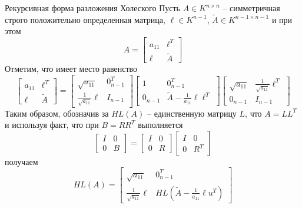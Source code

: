 \documentclass[10pt]{beamer}
\begin{document}
\begin{frame}{Рекурсивная форма разложения Холеского}
Пусть $A\in K^{n\times n}$ -- симметричная строго положительно определенная матрица, $\ell\in K^{n-1
}$, $\tilde{A}\in K^{n-1\times n-1}$ и при этом
$$
A=\left[\begin{array}{cc}
a_{11} & \ell^T \\
\ell & \tilde{A}
\end{array}
\right]
$$
\pause
Отметим, что имеет место равенство
$$
\left[\begin{array}{cc}
a_{11} & \ell^T \\
\ell & \tilde{A}
\end{array}
\right]
=
\left[\begin{array}{cc}
\sqrt{a_{11}} & 0^T_{n-1} \\
\frac{1}{\sqrt{a_{11}}}\ell & I_{n-1}
\end{array}
\right]
\left[\begin{array}{cc}
1 & 0_{n-1}^T \\
0_{n-1} & \tilde{A}-\frac{1}{a_{11}}\ell\ell^T
\end{array}
\right]
\left[\begin{array}{cc}
\sqrt{a_{11}} & \frac{1}{\sqrt{a_{11}}}\ell^T \\
0_{n-1} & I_{n-1}
\end{array}
\right]
$$
\pause
Таким образом, обозначив за $HL(A)$ -- единственную матрицу $L$, что $A=LL^T$ и используя факт, что при $B=RR^T$ выполняется
$$
\left[\begin{array}{cc}
I & 0 \\
0 & B
\end{array}
\right]
=
\left[\begin{array}{cc}
I & 0 \\
0 & R
\end{array}
\right]
\left[\begin{array}{cc}
I & 0 \\
0 & R^T
\end{array}
\right]
$$
\pause
получаем
$$
HL(A)=\left[\begin{array}{cc}
\sqrt{a_{11}} & 0^T_{n-1} \\
\frac{1}{\sqrt{a_{11}}}\ell & HL(\tilde{A}-\frac{1}{a_{11}}\ell u^T)
\end{array}
\right]
$$

\end{frame}
\end{document}
